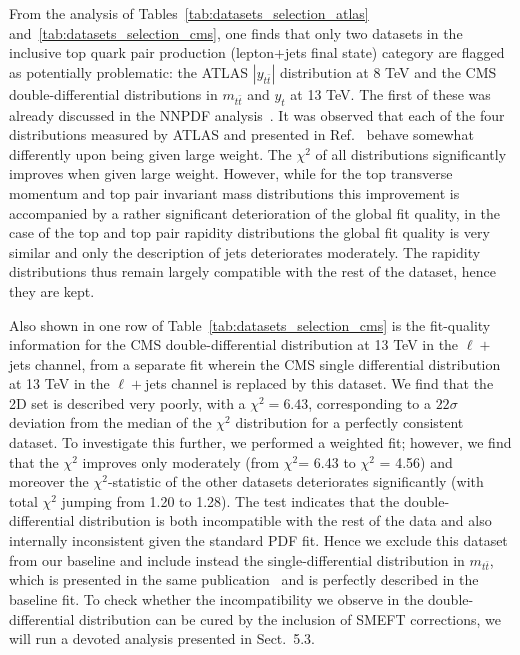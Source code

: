 \documentclass[withindex,glossary]{cam-thesis}
\begin{document}
  
    

    From the analysis of Tables~\ref{tab:datasets_selection_atlas} and~\ref{tab:datasets_selection_cms},
    one finds that only two datasets in the inclusive
    top quark pair production (lepton+jets final state) category are flagged as potentially
    problematic: the ATLAS $|y_{t\bar{t}}|$ distribution at 8 TeV
    and the CMS double-differential distributions in $m_{t\bar{t}}$ and $y_{t}$
    at 13 TeV.
    The first of these was already discussed in the NNPDF
    analysis~\cite{NNPDF:2021njg}. It was observed that each of the
    four distributions measured by ATLAS and presented in
    Ref.~\cite{Aad:2015mbv} behave somewhat differently upon being
    given large weight. The $\chi^2$ of all distributions significantly improves when given
large weight. However, while for the top transverse momentum and top pair invariant mass distributions this improvement is accompanied by a rather significant deterioration of the global fit quality, in the case of the top and
top pair rapidity distributions the global fit quality is very similar and only the description of jets
deteriorates moderately. The rapidity distributions thus remain
largely compatible with the rest of the dataset, hence they are kept.

    Also shown in one row of Table~\ref{tab:datasets_selection_cms} is the 
    fit-quality information for the CMS double-differential distribution at 13 TeV in the $\ell+$jets 
    channel, from a separate fit wherein the CMS single differential distribution at 13 TeV in the 
    $\ell+$jets channel is replaced by this dataset. We find that the
    2D set is described very poorly, with a $\chi^2=6.43$,
    corresponding to a $22\sigma$ deviation from the median of the $\chi^2$ distribution
  for a perfectly consistent dataset. To investigate this further, we performed a weighted fit; however, we find that the $\chi^2$
    improves only moderately (from $\chi^2$=
    6.43 to $\chi^2$ = 4.56) and moreover the $\chi^2$-statistic of the other datasets deteriorates
    significantly (with total $\chi^2$ jumping from 1.20 to 1.28). The test
    indicates that the double-differential distribution is both incompatible
    with the rest of the data and also internally inconsistent given the
    standard PDF fit. Hence we exclude this dataset from our baseline and
    include instead the single-differential distribution in $m_{t\bar{t}}$,
    which is presented in the same publication~\cite{CMS:2021vhb} and is
    perfectly described in the baseline fit.  To check whether the
    incompatibility we observe in the double-differential distribution can be
    cured by the inclusion of SMEFT corrections, we will run a devoted analysis
    presented in Sect.~5.3.
\end{document}
